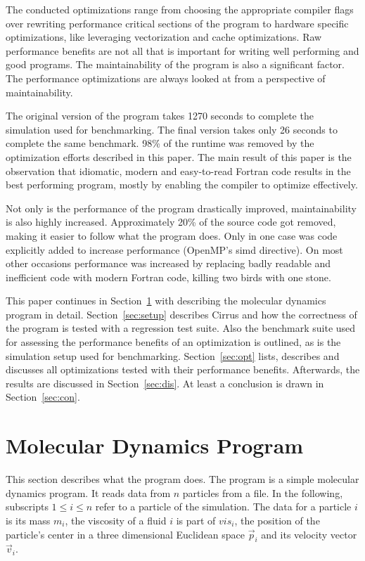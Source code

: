 \documentclass[twoside,11pt]{article}
\begin{document}
The conducted optimizations range from choosing the appropriate
compiler flags over rewriting performance critical sections of the
program to hardware specific optimizations, like leveraging
vectorization and cache optimizations.
Raw performance benefits are not all that is important for
writing well performing and good programs.
The maintainability of the program is also a significant factor.
The performance optimizations are always looked at from
a perspective of maintainability.

The original version of the program takes 1270 seconds to complete the
simulation used for benchmarking.
The final version takes only 26 seconds to complete the same
benchmark.
98\% of the runtime was removed by the optimization efforts described
in this paper.
The main result of this paper is the observation that idiomatic,
modern and easy-to-read Fortran code results in the best performing
program, mostly by enabling the compiler to optimize effectively.

Not only is the performance of the program drastically improved,
maintainability is also highly increased.
Approximately 20\% of the source code got removed, making it easier
to follow what the program does.
Only in one case was code explicitly added to increase performance
(OpenMP's simd directive).
On most other occasions performance was increased by replacing badly
readable and inefficient code with modern Fortran code, killing two
birds with one stone.

This paper continues in Section~\ref{sec:md} with describing the
molecular dynamics program in detail.
Section~\ref{sec:setup} describes Cirrus and how the correctness of
the program is tested with a regression test suite.
Also the benchmark suite used for assessing the performance benefits
of an optimization is outlined, as is the simulation setup used for
benchmarking.
Section~\ref{sec:opt} lists, describes and discusses all
optimizations tested with their performance benefits.
Afterwards, the results are discussed in Section~\ref{sec:dis}.
At least a conclusion is drawn in Section~\ref{sec:con}.


\section{Molecular Dynamics Program} %
\label{sec:md}

This section describes what the program does.
The program is a simple molecular dynamics program.
It reads data from $n$ particles from a file.
In the following, subscripts $1 \leq i \leq n$ refer to a particle
of the simulation.
The data for a particle $i$ is its mass $m_i$, the viscosity of
a fluid $i$ is part of $vis_i$, the position of the particle's center
in a three dimensional Euclidean space $\vec{p}_i$ and its velocity
vector $\vec{v}_i$.
\end{document}
